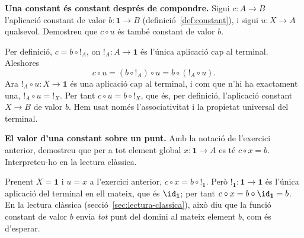 \begin{exercici}
\textbf{Una constant és constant després de compondre.} Sigui \(c\colon A\to B\) l'aplicació constant de valor \(b\colon\mathbf1\to B\) (definició~\ref{def:constant}), i sigui \(u\colon X\to A\) qualsevol. Demostreu que \(c\circ u\) és també constant de valor \(b\).
\end{exercici}
\begin{solucio}
Per definició, \(c=b\circ{!}_A\), on \({!}_A\colon A\to\mathbf1\) és l'única aplicació cap al terminal. Aleshores
\[
c\circ u=(b\circ{!}_A)\circ u=b\circ({!}_A\circ u).
\]
Ara \({!}_A\circ u\colon X\to\mathbf1\) és una aplicació cap al terminal, i com que n'hi ha exactament una, \({!}_A\circ u={!}_X\). Per tant \(c\circ u=b\circ{!}_X\), que és, per definició, l'aplicació constant \(X\to B\) de valor \(b\). Hem usat només l'associativitat i la propietat universal del terminal.
\end{solucio}

\begin{exercici}
\textbf{El valor d'una constant sobre un punt.} Amb la notació de l'exercici anterior, demostreu que per a tot element global \(x\colon\mathbf1\to A\) es té \(c\circ x=b\). Interpreteu-ho en la lectura clàssica.
\end{exercici}
\begin{solucio}
Prenent \(X=\mathbf1\) i \(u=x\) a l'exercici anterior, \(c\circ x=b\circ{!}_{\mathbf1}\). Però \({!}_{\mathbf1}\colon\mathbf1\to\mathbf1\) és l'única aplicació del terminal en ell mateix, que és \(\id_{\mathbf1}\); per tant \(c\circ x=b\circ\id_{\mathbf1}=b\). En la lectura clàssica (secció~\ref{sec:lectura-classica}), això diu que la funció constant de valor \(b\) envia \emph{tot} punt del domini al mateix element \(b\), com és d'esperar.
\end{solucio}
